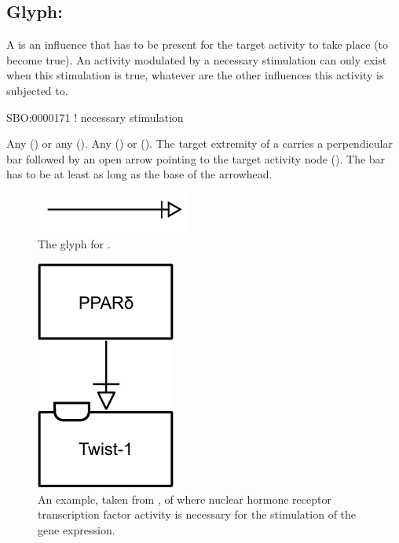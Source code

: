 \subsection{Glyph: }
\label{sec:af:trigger}
A  is an influence that has to be present for the target activity to take place (to become true).  An activity modulated by a necessary stimulation can only exist when this stimulation is true, whatever are the other influences this activity is subjected to.

\begin{glyphDescription}

\glyphSboTerm SBO:0000171 ! necessary stimulation

  \glyphOrigin Any  () or any  ().
 \glyphTarget Any  () or  ().
 \glyphEndPoint The target extremity of a  carries a perpendicular bar followed by an open arrow pointing to the target activity node ().  The bar has to be at least as long as the base of the arrowhead.

\end{glyphDescription}

\begin{figure}[H]
  \centering
  \includegraphics[width = 2in]{images/build/necessaryStimulation.pdf}
  \caption{The \AF glyph for .}
  \label{fig:af:trigger}
\end{figure}

\begin{figure}[H]
  \centering
  \includegraphics[scale=1]{src/images/build/necessary_stimulation_example.pdf}
  \caption{An example, taken from , of  where nuclear hormone receptor  transcription factor activity is necessary for the stimulation of the  gene expression. }
  \label{fig:af:ex-NS}
\end{figure}
